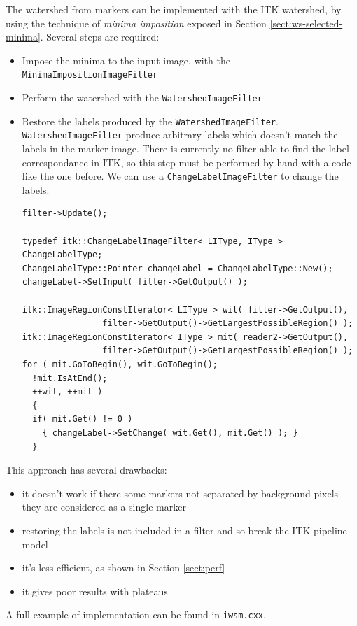 \documentclass{InsightArticle}
\begin{document}
The watershed from markers can be implemented with the ITK watershed,
by using the technique of {\em minima imposition} exposed in Section
\ref{sect:ws-selected-minima}. Several steps are required:
\begin{itemize}
  \item Impose the minima to the input image, with the
\verb$MinimaImpositionImageFilter$
  \item Perform the watershed with the \verb$WatershedImageFilter$
  \item Restore the labels produced by the \verb$WatershedImageFilter$.
\verb$WatershedImageFilter$ produce arbitrary labels which doesn't match
the labels in the marker image. There is currently no filter able to
find the label correspondance in ITK, so this step must be performed by
hand with a code like the one before. We can use a
\verb$ChangeLabelImageFilter$ to change the labels.
\small \begin{verbatim}
filter->Update();

typedef itk::ChangeLabelImageFilter< LIType, IType > ChangeLabelType;
ChangeLabelType::Pointer changeLabel = ChangeLabelType::New();
changeLabel->SetInput( filter->GetOutput() );

itk::ImageRegionConstIterator< LIType > wit( filter->GetOutput(),
                filter->GetOutput()->GetLargestPossibleRegion() );
itk::ImageRegionConstIterator< IType > mit( reader2->GetOutput(),
                filter->GetOutput()->GetLargestPossibleRegion() );
for ( mit.GoToBegin(), wit.GoToBegin();
  !mit.IsAtEnd();
  ++wit, ++mit )
  {
  if( mit.Get() != 0 )
    { changeLabel->SetChange( wit.Get(), mit.Get() ); }
  }
\end{verbatim} \normalsize
\end{itemize}

This approach has several drawbacks:
\begin{itemize}
  \item it doesn't work if there some markers not separated by background
pixels - they are considered as a single marker
  \item restoring the labels is not included in a filter and so break the
ITK pipeline model
  \item it's less efficient, as shown in Section \ref{sect:perf}
  \item it gives poor results with plateaus
\end{itemize}

A full example of implementation can be found in \verb$iwsm.cxx$.
\end{document}
